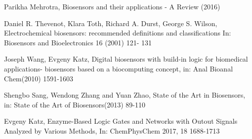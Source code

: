 \documentclass[runningheads]{llncs}
\begin{document}
\begin{thebibliography}{8}
	Parikha Mehrotra, Biosensors and their applications - A Review (2016)
	
	Daniel R. Thevenot, Klara Toth, Richard A. Durst, George S. Wilson, Electrochemical biosensors: recommended definitions and classifications In: Biosensors and Bioelectronics 16 (2001) 121- 131
	
	Joseph Wang, Evgeny Katz, Digital biosensors with build-in logic for biomedical applications- biosensors based on a biocomputing concept, in: Anal Bioanal Chem(2010) 1591-1603
	
	Shengbo Sang, Wendong Zhang and Yuan Zhao, State of the Art in Biosensors, in: State of the Art of Biosensors(2013) 89-110
	
	Evgeny Katz, Enzyme-Based Logic Gates and Networks with Outout Signals Analyzed by Various Methods, In: ChemPhysChem 2017, 18 1688-1713
	
\end{thebibliography}
\end{document}
